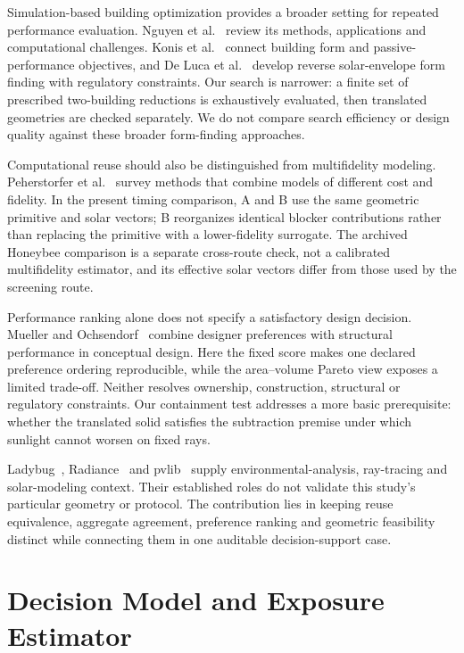 \documentclass{llncs}
\begin{document}
Simulation-based building optimization provides a broader setting for repeated performance evaluation. Nguyen et al.~\cite{nguyen2014review} review its methods, applications and computational challenges. Konis et al.~\cite{konis2016passive} connect building form and passive-performance objectives, and De Luca et al.~\cite{deluca2021reverse} develop reverse solar-envelope form finding with regulatory constraints. Our search is narrower: a finite set of prescribed two-building reductions is exhaustively evaluated, then translated geometries are checked separately. We do not compare search efficiency or design quality against these broader form-finding approaches.

Computational reuse should also be distinguished from multifidelity modeling. Peherstorfer et al.~\cite{peherstorfer2018survey} survey methods that combine models of different cost and fidelity. In the present timing comparison, A and B use the same geometric primitive and solar vectors; B reorganizes identical blocker contributions rather than replacing the primitive with a lower-fidelity surrogate. The archived Honeybee comparison is a separate cross-route check, not a calibrated multifidelity estimator, and its effective solar vectors differ from those used by the screening route.

Performance ranking alone does not specify a satisfactory design decision. Mueller and Ochsendorf~\cite{mueller2015preferences} combine designer preferences with structural performance in conceptual design. Here the fixed score makes one declared preference ordering reproducible, while the area--volume Pareto view exposes a limited trade-off. Neither resolves ownership, construction, structural or regulatory constraints. Our containment test addresses a more basic prerequisite: whether the translated solid satisfies the subtraction premise under which sunlight cannot worsen on fixed rays.

Ladybug~\cite{roudsari2013ladybug}, Radiance~\cite{ward1994radiance} and pvlib~\cite{holmgren2018pvlib} supply environmental-analysis, ray-tracing and solar-modeling context. Their established roles do not validate this study's particular geometry or protocol. The contribution lies in keeping reuse equivalence, aggregate agreement, preference ranking and geometric feasibility distinct while connecting them in one auditable decision-support case.

\section{Decision Model and Exposure Estimator}
\end{document}
